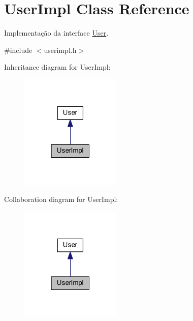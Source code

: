 \hypertarget{classUserImpl}{}\section{User\+Impl Class Reference}
\label{classUserImpl}


Implementação da interface \hyperlink{classUser}{User}.  




{\ttfamily \#include $<$userimpl.\+h$>$}



Inheritance diagram for User\+Impl\+:
\nopagebreak
\begin{figure}[H]
\begin{center}
\leavevmode
\includegraphics[width=136pt]{db/da3/classUserImpl__inherit__graph}
\end{center}
\end{figure}


Collaboration diagram for User\+Impl\+:
\nopagebreak
\begin{figure}[H]
\begin{center}
\leavevmode
\includegraphics[width=136pt]{df/d98/classUserImpl__coll__graph}
\end{center}
\end{figure}
